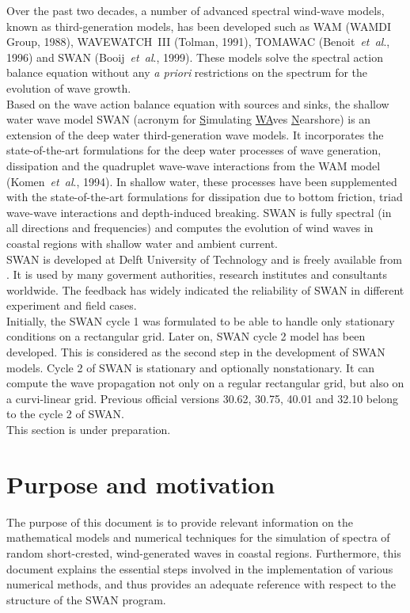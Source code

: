 \documentclass[12pt]{book}
\newcommand{\hl}[1]{\htmladdnormallink{{\it #1}}{#1}}
\begin{document}
Over the past two decades, a number of advanced spectral wind-wave models, known as
third-generation models, has been developed such as WAM (WAMDI Group, 1988), WAVEWATCH~III
(Tolman, 1991), TOMAWAC (Benoit~{\it et~al}., 1996) and SWAN (Booij~{\it et~al}., 1999).
These models solve the spectral action balance equation without any {\em a priori} restrictions
on the spectrum for the evolution of wave growth.
\\[2ex]
\noindent
Based on the wave action balance equation with sources and sinks, the shallow water
wave model SWAN (acronym for \underline{S}imulating \underline{WA}ves \underline{N}earshore)
is an extension of the deep water third-generation wave models.
It incorporates the state-of-the-art formulations for the deep water processes of
wave generation, dissipation and the quadruplet wave-wave interactions from the
WAM model (Komen~{\it et~al}., 1994). In shallow water, these processes have been
supplemented with the state-of-the-art formulations for dissipation due to bottom
friction, triad wave-wave interactions and depth-induced breaking. SWAN is fully
spectral (in all directions and frequencies) and computes the evolution of wind
waves in coastal regions with shallow water and ambient current.
\\[2ex]
\noindent
SWAN is developed at Delft University of Technology and is freely available from\\
\hl{http://www.swan.tudelft.nl}. It is used by many goverment
authorities, research institutes and consultants worldwide. The feedback has widely
indicated the reliability of SWAN in different experiment and field cases.
\\[2ex]
\noindent
Initially, the SWAN cycle 1 was formulated to be able to handle only stationary conditions
on a rectangular grid. Later on, SWAN cycle 2 model has been developed. This is considered
as the second step in the development of SWAN models. Cycle 2 of SWAN is stationary
and optionally nonstationary. It can compute the wave propagation not only on a regular
rectangular grid, but also on a curvi-linear grid. Previous official versions 30.62, 30.75,
40.01 and 32.10 belong to the cycle 2 of SWAN.
\\[2ex]
\noindent
This section is under preparation.

\section{Purpose and motivation} \label{sec:purp}

The purpose of this document is to provide relevant information on the mathematical models and numerical techniques for
the simulation of spectra of random short-crested, wind-generated waves in coastal regions. Furthermore, this document
explains the essential steps involved in the implementation of various numerical methods, and thus provides an adequate
reference with respect to the structure of the SWAN program.
\end{document}
